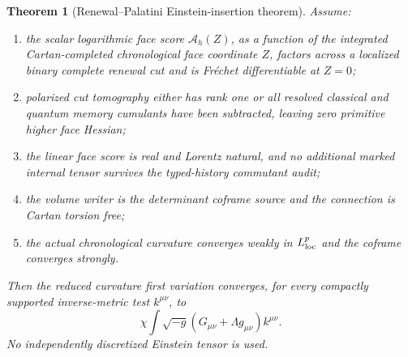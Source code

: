 \documentclass[11pt]{article}
\newtheorem{theorem}{Theorem}[section]
\theoremstyle{definition}
\theoremstyle{remark}
\begin{document}
\begin{theorem}[Renewal--Palatini Einstein-insertion theorem]
\label{thm:master-Einstein-insertion-v036}
Assume:
\begin{enumerate}[label=\textup{(E\arabic*)},leftmargin=3em]
\item the scalar logarithmic face score \(\mathcal A_h(Z)\), as a function of
      the integrated Cartan-completed chronological face coordinate \(Z\),
      factors across a localized binary complete renewal cut and is Fr\'echet
      differentiable at \(Z=0\);
\item polarized cut tomography either has rank one or all resolved classical
      and quantum memory cumulants have been subtracted, leaving zero primitive
      higher face Hessian;
\item the linear face score is real and Lorentz natural, and no additional
      marked internal tensor survives the typed-history commutant audit;
\item the volume writer is the determinant coframe source and the connection is
      Cartan torsion free;
\item the actual chronological curvature converges weakly in \(L^p_{\rm loc}\)
      and the coframe converges strongly.
\end{enumerate}
Then the reduced curvature first variation converges, for every compactly
supported inverse-metric test \(k^{\mu\nu}\), to
\[
 \boxed{
 \chi\int\sqrt{-g}
 (G_{\mu\nu}+\Lambda g_{\mu\nu})k^{\mu\nu}.}
\]
No independently discretized Einstein tensor is used.
\end{theorem}
\end{document}
